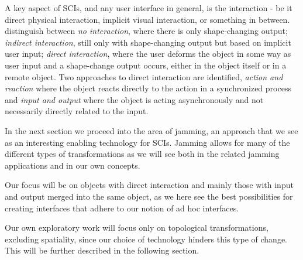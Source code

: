 A key aspect of SCIs, and any user interface in general, is the interaction - be it direct physical interaction, implicit visual interaction, or something in between. 
\citeauthor{rasmussen2012shape} distinguish between \textit{no interaction}, where there is only shape-changing output; \textit{indirect interaction}, still only with shape-changing output but based on implicit user input; \textit{direct interaction}, where the user deforms the object in some way as user input and a shape-change output occurs, either in the object itself or in a remote object.
Two approaches to direct interaction are identified, \textit{action and reaction} where the object reacts directly to the action in a synchronized process and \textit{input and output} where the object is acting asynchronously and not necessarily directly related to the input.

In the next section we proceed into the area of jamming, an approach that we see as an interesting enabling technology for SCIs.
Jamming allows for many of the different types of transformations as we will see both in the related jamming applications and in our own concepts. 

Our focus will be on objects with direct interaction and mainly those with input and output merged into the same object, as we here see the best possibilities for creating interfaces that adhere to our notion of ad hoc interfaces.
 
Our own exploratory work will focus only on topological transformations, excluding spatiality, since our choice of technology hinders this type of change. This will be further described in the following section.